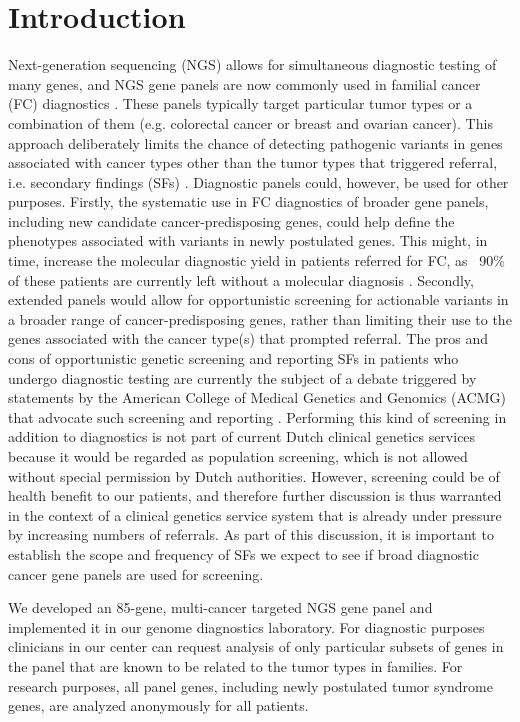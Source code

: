 \section{Introduction}\label{introduction}
Next-generation sequencing (NGS) allows for simultaneous diagnostic testing of many genes, and NGS gene panels are now commonly used in familial cancer (FC) diagnostics \cite{Okur_2017}. 
These panels typically target particular tumor types or a combination of them (e.g. colorectal cancer or breast and ovarian cancer). 
This approach deliberately limits the chance of detecting pathogenic variants in genes associated with cancer types other than the tumor types that triggered referral, i.e. secondary findings (SFs) \cite{DeRycke_2017,Concolino_2018}. 
Diagnostic panels could, however, be used for other purposes. 
Firstly, the systematic use in FC diagnostics of broader gene panels, including new candidate cancer-predisposing genes, could help define the phenotypes associated with variants in newly postulated genes. 
This might, in time, increase the molecular diagnostic yield in patients referred for FC, as ~90\% of these patients are currently left without a molecular diagnosis \cite{Tung_2016,Thompson_2016,Minion_2015,LaDuca_2014}. 
Secondly, extended panels would allow for opportunistic screening for actionable variants in a broader range of cancer-predisposing genes, rather than limiting their use to the genes associated with the cancer type(s) that prompted referral. The pros and cons of opportunistic genetic screening and reporting SFs in patients who undergo diagnostic testing are currently the subject of a debate triggered by statements by the American College of Medical Genetics and Genomics (ACMG) that advocate such screening and reporting \cite{Green_2013,Burke_2013,Yu_2014,Kalia_2016,Haer_Wigman_2018,Wouters_2018,Brothers_2019,Esplin_2018}. 
Performing this kind of screening in addition to diagnostics is not part of current Dutch clinical genetics services because it would be regarded as population screening, which is not allowed without special permission by Dutch authorities. However, screening could be of health benefit to our patients, and therefore further discussion is thus warranted in the context of a clinical genetics service system that is already under pressure by increasing numbers of referrals. 
As part of this discussion, it is important to establish the scope and frequency of SFs we expect to see if broad diagnostic cancer gene panels are used for screening. 

We developed an 85-gene, multi-cancer targeted NGS gene panel and implemented it in our genome diagnostics laboratory. 
For diagnostic purposes clinicians in our center can request analysis of only particular subsets of genes in the panel that are known to be related to the tumor types in families. 
For research purposes, all panel genes, including newly postulated tumor syndrome genes, are analyzed anonymously for all patients.

